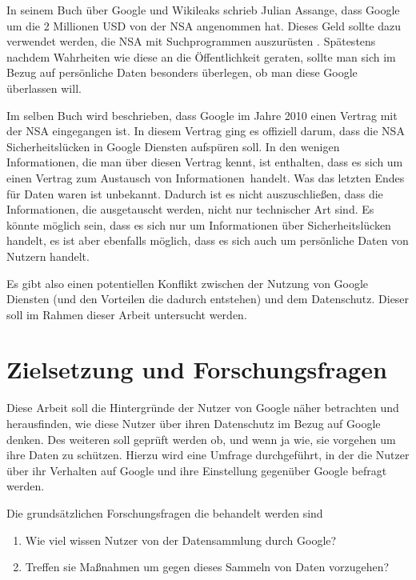 In seinem Buch über Google und Wikileaks schrieb Julian Assange, dass Google um die 2 Millionen USD von der NSA angenommen hat. Dieses Geld sollte dazu verwendet werden, die NSA mit Suchprogrammen auszurüsten \cite{assangebook}. Spätestens nachdem Wahrheiten wie diese an die Öffentlichkeit geraten, sollte man sich im Bezug auf persönliche Daten besonders überlegen, ob man diese Google überlassen will.

Im selben Buch wird beschrieben, dass Google im Jahre 2010 einen Vertrag mit der NSA eingegangen ist. In diesem Vertrag ging es offiziell darum, dass die NSA Sicherheitslücken in Google Diensten aufspüren soll. In den wenigen Informationen, die man über diesen Vertrag kennt, ist enthalten, dass es sich um einen Vertrag zum \glqq Austausch von Informationen\grqq\ handelt. Was das letzten Endes für Daten waren ist unbekannt. Dadurch ist es nicht auszuschließen, dass die Informationen, die ausgetauscht werden, nicht nur technischer Art sind. Es könnte möglich sein, dass es sich nur um Informationen über Sicherheitslücken handelt, es ist aber ebenfalls möglich, dass es sich auch um persönliche Daten von Nutzern handelt.

Es gibt also einen potentiellen Konflikt zwischen der Nutzung von Google Diensten (und den Vorteilen die dadurch entstehen) und dem Datenschutz. Dieser soll im Rahmen dieser Arbeit untersucht werden.

\section{Zielsetzung und Forschungsfragen}
\label{sec:questions}
Diese Arbeit soll die Hintergründe der Nutzer von Google näher betrachten und herausfinden, wie diese Nutzer über ihren Datenschutz im Bezug auf Google denken. Des weiteren soll geprüft werden ob, und wenn ja wie, sie vorgehen um ihre Daten zu schützen. Hierzu wird eine Umfrage durchgeführt, in der die Nutzer über ihr Verhalten auf Google und ihre Einstellung gegenüber Google befragt werden.

Die grundsätzlichen Forschungsfragen die behandelt werden sind
\begin{enumerate}
\item Wie viel wissen Nutzer von der Datensammlung durch Google?
\item Treffen sie Maßnahmen um gegen dieses Sammeln von Daten vorzugehen?
\end{enumerate}